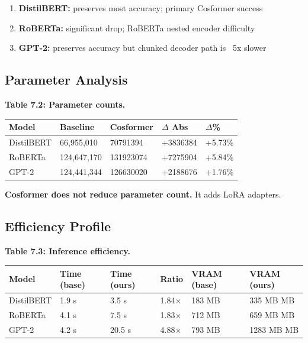 \begin{enumerate}
\item \textbf{DistilBERT:} preserves most accuracy; primary Cosformer success
\item \textbf{RoBERTa:} significant drop; RoBERTa nested encoder difficulty
\item \textbf{GPT-2:} preserves accuracy but chunked decoder path is ~5x slower

\end{enumerate}
\subsection{Parameter Analysis}

\textbf{Table 7.2: Parameter counts.}

\begin{table}[H]
\centering
\small
\begin{tabular}{lllll}
\toprule
\textbf{Model} & \textbf{Baseline} & \textbf{Cosformer} & \textbf{$\Delta$ Abs} & \textbf{$\Delta$\%} \\
\midrule
DistilBERT & 66,955,010 & 70791394 & +3836384 & +5.73\% \\
RoBERTa & 124,647,170 & 131923074 & +7275904 & +5.84\% \\
GPT-2 & 124,441,344 & 126630020 & +2188676 & +1.76\% \\
\bottomrule
\end{tabular}
\end{table}

\textbf{Cosformer does not reduce parameter count.} It adds LoRA adapters.

\subsection{Efficiency Profile}

\textbf{Table 7.3: Inference efficiency.}

\begin{table}[H]
\centering
\small
\begin{tabular}{llllll}
\toprule
\textbf{Model} & \textbf{Time (base)} & \textbf{Time (ours)} & \textbf{Ratio} & \textbf{VRAM (base)} & \textbf{VRAM (ours)} \\
\midrule
DistilBERT & 1.9 s & 3.5 s & 1.84$\times$ & 183 MB & 335 MB MB \\
RoBERTa & 4.1 s & 7.5 s & 1.83$\times$ & 712 MB & 659 MB MB \\
GPT-2 & 4.2 s & 20.5 s & 4.88$\times$ & 793 MB & 1283 MB MB \\
\bottomrule
\end{tabular}
\end{table}

